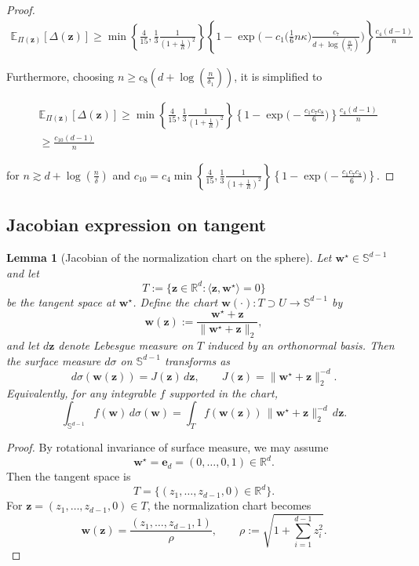 \documentclass{article}
\theoremstyle{plain}
\newtheorem{lemma}[theorem]{Lemma}
\theoremstyle{definition}
\theoremstyle{remark}
\begin{document}
{\begin{proof}
\begin{align}
     \mathbb E_{\Pi(\mathbf{z})}[\Delta(\mathbf z)] \geq \min\left\{\frac{4}{15}, \frac{1}{3} \frac{1}{(1+\frac{1}{R})^2}\right\} \left\{
1-
\exp\!\Bigg(
-c_1\Big(\tfrac{1}{6}n\kappa\Big)
\frac{c_{7}}{d+\log(\frac{n}{\delta_{1}})}
\Bigg) 
\right\} \frac{c_{4}(d-1)}{n} 
\end{align}

Furthermore, choosing $n \geq c_{8} (d+\log(\frac{n}{\delta_{1}}))$, it is simplified to 


\begin{align}
 &    \mathbb E_{\Pi(\mathbf{z})}[\Delta(\mathbf z)] \geq  \min\left\{\frac{4}{15}, \frac{1}{3} \frac{1}{(1+\frac{1}{R})^2}\right\}\left\{
1-
\exp\!\Bigg(
-
\frac{c_1c_{7} c_{8}}{6}
\Bigg) 
\right\} \frac{c_{4}(d-1)}{n}  \\
& \geq  \frac{c_{10}(d-1)}{n}
\end{align}

for $n \gtrsim d + \log(\frac{n}{\delta})$ and $c_{10} =c_{4}\min\left\{\frac{4}{15}, \frac{1}{3} \frac{1}{(1+\frac{1}{R})^2}\right\}\left\{
1-
\exp\!\Bigg(
-
\frac{c_1c_{7} c_{8}}{6}
\Bigg) 
\right\} $. 

\end{proof}

\subsection{Jacobian expression on tangent}
\begin{lemma}[Jacobian of the normalization chart on the sphere]
\label{lem:jacobian_sphere}
Let $\mathbf w^\star\in\mathbb S^{d-1}$ and let
\[
T:=\{\mathbf z\in\mathbb R^d:\langle \mathbf z,\mathbf w^\star\rangle=0\}
\]
be the tangent space at $\mathbf w^\star$.
Define the chart $\mathbf w(\cdot):T\supset U\to \mathbb S^{d-1}$ by
\[
\mathbf w(\mathbf z):=\frac{\mathbf w^\star+\mathbf z}{\|\mathbf w^\star+\mathbf z\|_2},
\]
and let $d\mathbf z$ denote Lebesgue measure on $T$ induced by an orthonormal basis.
Then the surface measure $d\sigma$ on $\mathbb S^{d-1}$ transforms as
\[
d\sigma(\mathbf w(\mathbf z)) = J(\mathbf z)\,d\mathbf z,
\qquad
J(\mathbf z)=\|\mathbf w^\star+\mathbf z\|_2^{-d}.
\]
Equivalently, for any integrable $f$ supported in the chart,
\[
\int_{\mathbb S^{d-1}} f(\mathbf w)\,d\sigma(\mathbf w)
=
\int_T f(\mathbf w(\mathbf z))\,\|\mathbf w^\star+\mathbf z\|_2^{-d}\,d\mathbf z.
\]
\end{lemma}


\begin{proof}
By rotational invariance of surface measure, we may assume
\[
\mathbf w^\star=\mathbf e_d=(0,\dots,0,1)\in\mathbb R^d.
\]
Then the tangent space is
\[
T=\{(z_1,\dots,z_{d-1},0)\in\mathbb R^d\}.
\]
For $\mathbf z=(z_1,\dots,z_{d-1},0)\in T$, the normalization chart becomes
\[
\mathbf w(\mathbf z)
=
\frac{(z_1,\dots,z_{d-1},1)}{\rho},
\qquad
\rho:=\sqrt{1+\sum_{i=1}^{d-1}z_i^2}.
\]


\end{proof}}
\end{document}
